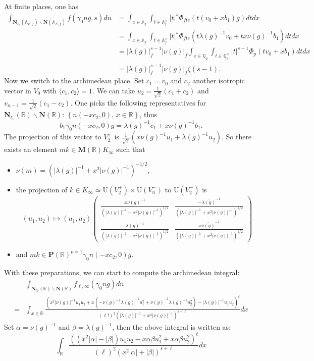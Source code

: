 \documentclass[12pt]{article}
\theoremstyle{remark}
\theoremstyle{definition}
\newcommand{\Q}{\mathbb{Q}}
\newcommand{\R}{\mathbb{R}}
\newcommand{\A}{\mathbb{A}}
\newcommand{\lrangle}[2]{\langle #1,#2\rangle}
\newcommand{\rmm}[1]{\mathrm{#1}}
\newcommand{\bff}[1]{\mathbf{#1}}
\begin{document}
At finite places, one has 
   \begin{align*}
       \int_{\bff{N}_{\ell_{0}}(\A_{E,f})\backslash\bff{N}(\A_{E,f})}f(\gamma_{0}ng,s)dn&=\int_{x\in\A_{f}}\int_{t\in\A_{f}^{\times}}|t|^{s}\Phi_{fte}(t(v_{0}+xb_{1})g)dtdx\\
       &=\int_{x\in\A_{f}}\int_{t\in\A_{f}^{\times}}|t|^{s}\Phi_{fte}(t\lambda(g)^{-1}v_{0}+tx\nu(g)^{-1}b_{1})dtdx\\
       &=|\lambda(g)|_{f}^{s-1}|\nu(g)|_{f}\int_{x\in\Q_{p}}\int_{t\in\Q_{p}^{\times}}|t|^{s-1}\Phi_{p}(tv_{0}+xb_{1})dtdx\\
       &=|\lambda(g)|_{f}^{s-1}|\nu(g)|_{f}\zeta(s-1).
   \end{align*}
   Now we switch to the archimedean place.
   Set $c_{1}=v_{0}$ and $c_{2}$ another isotropic vector in $V_{0}$ with $\lrangle{c_{1}}{c_{2}}=1$.
   We can take $u_{2}=\frac{1}{\sqrt{2}}(c_{1}+c_{2})$ and $v_{n-1}=\frac{1}{\sqrt{2}}(c_{1}-c_{2})$.
   One picks the following representatives for $\bff{N}_{\ell_{0}}(\R)\backslash\bff{N}(\R)$: 
   $\left\{n(-xc_{2},0),\,x\in\R \right\}$,
   thus 
   \[b_{1}\gamma_{0}n(-xc_{2},0)g=\lambda(g)^{-1}c_{1}+x\nu(g)^{-1}b_{1}.\]
   The projection of this vector to $V_{2}^{+}$ is $\frac{1}{\sqrt{2}}(x\nu(g)^{-1}u_{1}+\lambda(g)^{-1}u_{2})$.
   So there exists an element $mk\in\bff{M}(\R)K_{\infty}$
   such that 
   \begin{itemize}
       \item $\nu(m)=(|\lambda(g)|^{-1}+x^{2}|\nu(g)|^{-1})^{-1/2}$,
       \item the projection of $k\in K_{\infty}\simeq \rmm{U}(V_{2}^{+})\times\rmm{U}(V_{n}^{-})$ to $\rmm{U}(V_{2}^{+})$ is 
       \[(u_{1},u_{2})\mapsto (u_{1},u_{2})\left(\begin{matrix}
           \frac{x\nu(g)^{-1}}{(|\lambda(g)|^{-1}+x^{2}|\nu(g)|^{-1})^{1/2}}&\frac{-\overline{\lambda(g)}^{-1}}{(|\lambda(g)|^{-1}+x^{2}|\nu(g)|^{-1})^{1/2}}\\
           \frac{\lambda(g)^{-1}}{(|\lambda(g)|^{-1}+x^{2}|\nu(g)|^{-1})^{1/2}}&\frac{x\overline{\nu(g)}^{-1}}{(|\lambda(g)|^{-1}+x^{2}|\nu(g)|^{-1})^{1/2}}
       \end{matrix}\right)\]
       \item and $mk\in \bff{P}(\R)^{\nu=1}\gamma_{0}n(-xc_{2},0)g.$
   \end{itemize}
   With these preparations,
   we can start to compute the archimedean integral:
   \begin{align*}
       &\int_{\bff{N}_{\ell_{0}}(\R)\backslash \bff{N}(\R)}f_{\ell,\infty}(\gamma_{0}ng)dn\\
       =&\int_{x\in\R}\frac{\left(x^{2}|\nu(g)|^{-1}u_{1}u_{2}+x\left(-\nu(g)^{-1}\overline{\lambda(g)}^{-1}u_{1}^{2}+\overline{\nu(g)}^{-1}\lambda(g)^{-1}u_{2}^{2}\right)-|\lambda(g)|^{-1}u_{1}u_{2}\right)^{\ell}}{(\ell !)^{2}(|\lambda(g)|^{-1}+x^{2}|\nu(g)|^{-1})^{s+\ell}}dx
   \end{align*}
   Set $\alpha=\nu(g)^{-1}$ and $\beta=\lambda(g)^{-1}$,
   then the above integral is written as:
   \[\int_{\R}\frac{\left(\left(x^{2}|\alpha|-|\beta|\right)u_{1}u_{2}-x\alpha\overline{\beta}u_{1}^{2}+x\overline{\alpha}\beta u_{2}^{2}\right)^{\ell}}{(\ell)^{2}(x^{2}|\alpha|+|\beta|)^{s+\ell}}dx\]
\end{document}
